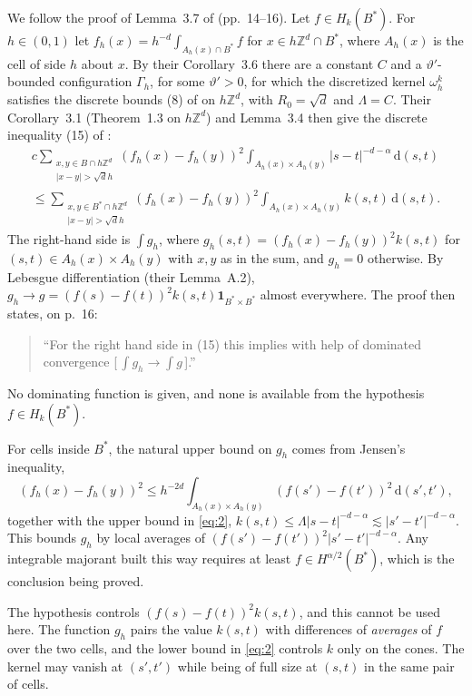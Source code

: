 \documentclass[11pt]{amsart}
\theoremstyle{remark}
\newcommand{\Z}{\mathbb{Z}}
\newcommand{\dd}{\,\mathrm{d}}
\newcommand{\abs}[1]{\lvert #1\rvert}
\newcommand{\norm}[1]{\lvert #1\rvert}
\newcommand{\1}{\mathbf{1}}
\begin{document}
We follow the proof of Lemma~3.7 of \cite{BKS} (pp.~14--16). Let $f\in H_k(B^*)$. For $h\in(0,1)$
let $f_h(x)=h^{-d}\int_{A_h(x)\cap B^*}f$ for $x\in h\Z^d\cap B^*$, where $A_h(x)$ is the cell of
side $h$ about $x$. By their Corollary~3.6 there are a constant $C$ and a $\vartheta'$-bounded
configuration $\Gamma_h$, for some $\vartheta'>0$, for which the discretized kernel $\omega^k_h$
satisfies the discrete bounds (8) of \cite{BKS} on $h\Z^d$, with $R_0=\sqrt d$ and $\Lambda=C$. Their
Corollary~3.1 (Theorem~1.3 on $h\Z^d$) and Lemma~3.4 then give the discrete inequality (15) of
\cite{BKS}:
\begin{multline*}
  c\sum_{\substack{x,y\in B\cap h\Z^d\\ \abs{x-y}>\sqrt d h}}(f_h(x)-f_h(y))^2
    \int_{A_h(x)\times A_h(y)}\abs{s-t}^{-d-\alpha}\dd(s,t)\\
  \le\sum_{\substack{x,y\in B^*\cap h\Z^d\\ \abs{x-y}>\sqrt d h}}(f_h(x)-f_h(y))^2
    \int_{A_h(x)\times A_h(y)}k(s,t)\dd(s,t).
\end{multline*}
The right-hand side is $\int g_h$, where $g_h(s,t)=(f_h(x)-f_h(y))^2k(s,t)$ for
$(s,t)\in A_h(x)\times A_h(y)$ with $x,y$ as in the sum, and $g_h=0$ otherwise.
By Lebesgue differentiation (their Lemma~A.2), $g_h\to g=(f(s)-f(t))^2k(s,t)\1_{B^*\times B^*}$
almost everywhere. The proof then states, on p.~16:
\begin{quote}
``For the right hand side in (15) this implies with help of dominated convergence
[$\,\int g_h\to\int g\,$].''
\end{quote}
No dominating function is given, and none is available from the hypothesis $f\in H_k(B^*)$.

For cells inside $B^*$, the natural upper bound on $g_h$ comes from Jensen's inequality,
\[
  (f_h(x)-f_h(y))^2\le h^{-2d}\int_{A_h(x)\times A_h(y)}(f(s')-f(t'))^2\dd(s',t'),
\]
together with the upper bound in \eqref{eq:2},
$k(s,t)\le\Lambda\norm{s-t}^{-d-\alpha}\lesssim\norm{s'-t'}^{-d-\alpha}$.
This bounds $g_h$ by local averages of $(f(s')-f(t'))^2\norm{s'-t'}^{-d-\alpha}$. Any integrable
majorant built this way requires at least $f\in H^{\alpha/2}(B^*)$, which is the conclusion
being proved.

The hypothesis controls $(f(s)-f(t))^2k(s,t)$, and this cannot be used here. The function $g_h$
pairs the value $k(s,t)$ with differences of \emph{averages} of $f$ over the two cells, and the
lower bound in \eqref{eq:2} controls $k$ only on the cones. The kernel may vanish at $(s',t')$
while being of full size at $(s,t)$ in the same pair of cells.
\end{document}
